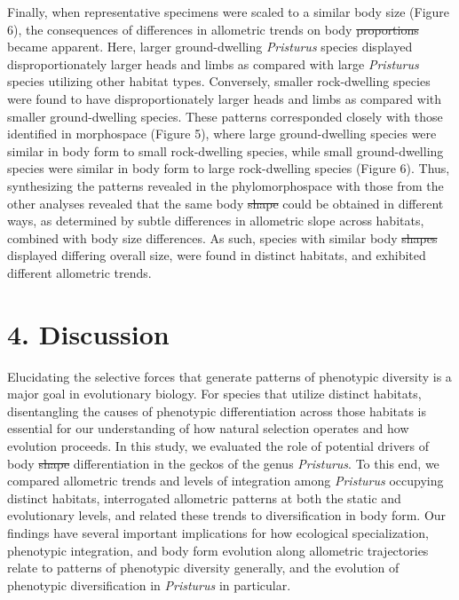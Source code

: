\documentclass[
  11pt,
]{article}
\providecommand{\DIFaddtex}[1]{{\protect\color{blue}\uwave{#1}}} %
\providecommand{\DIFdeltex}[1]{{\protect\color{red}\sout{#1}}}                      %
\providecommand{\DIFaddbegin}{} %
\providecommand{\DIFaddend}{} %
\providecommand{\DIFdelbegin}{} %
\providecommand{\DIFdelend}{} %
\providecommand{\DIFadd}[1]{\texorpdfstring{\DIFaddtex{#1}}{#1}} %
\providecommand{\DIFdel}[1]{\texorpdfstring{\DIFdeltex{#1}}{}} %
\newcommand{\DIFscaledelfig}{0.5}
\newlength{\DIFdelgraphicswidth} %
\newlength{\DIFdelgraphicsheight} %
\newcommand{\DIFaddincludegraphics}[2][]{{\color{blue}\fbox{\DIFOincludegraphics[#1]{#2}}}} %
\newcommand{\DIFdelincludegraphics}[2][]{%
\sbox{\DIFdelgraphicsbox}{\DIFOincludegraphics[#1]{#2}}%
\settoboxwidth{\DIFdelgraphicswidth}{\DIFdelgraphicsbox} %
\settoboxtotalheight{\DIFdelgraphicsheight}{\DIFdelgraphicsbox} %
\scalebox{\DIFscaledelfig}{%
\parbox[b]{\DIFdelgraphicswidth}{\usebox{\DIFdelgraphicsbox}\\[-\baselineskip] \rule{\DIFdelgraphicswidth}{0em}}\llap{\resizebox{\DIFdelgraphicswidth}{\DIFdelgraphicsheight}{%
\setlength{\unitlength}{\DIFdelgraphicswidth}%
\begin{picture}(1,1)%
\thicklines\linethickness{2pt} %
{\color[rgb]{1,0,0}\put(0,0){\framebox(1,1){}}}%
{\color[rgb]{1,0,0}\put(0,0){\line( 1,1){1}}}%
{\color[rgb]{1,0,0}\put(0,1){\line(1,-1){1}}}%
\end{picture}%
}\hspace*{3pt}}} %
} %
\DeclareRobustCommand{\DIFaddbegin}{\DIFOaddbegin \let\includegraphics\DIFaddincludegraphics} %
\DeclareRobustCommand{\DIFaddend}{\DIFOaddend \let\includegraphics\DIFOincludegraphics} %
\DeclareRobustCommand{\DIFdelbegin}{\DIFOdelbegin \let\includegraphics\DIFdelincludegraphics} %
\DeclareRobustCommand{\DIFdelend}{\DIFOaddend \let\includegraphics\DIFOincludegraphics} %
\begin{document}
Finally, when representative specimens were scaled to a similar body
size (Figure 6), the \DIFaddbegin \DIFadd{anatomical }\DIFaddend consequences of differences in
allometric trends on body \DIFdelbegin \DIFdel{proportions }\DIFdelend \DIFaddbegin \DIFadd{form }\DIFaddend became apparent. Here, larger
ground-dwelling \emph{Pristurus} species displayed disproportionately
larger heads and limbs as compared with large \emph{Pristurus} species
utilizing other habitat types. Conversely, smaller rock-dwelling species
were found to have disproportionately larger heads and limbs as compared
with smaller ground-dwelling species. These patterns corresponded
closely with those identified in morphospace (Figure 5), where large
ground-dwelling species were similar in body form to small rock-dwelling
species, while small ground-dwelling species were similar in body form
to large rock-dwelling species (Figure 6). Thus, synthesizing the
patterns revealed in the phylomorphospace with those from the other
analyses revealed that the same body \DIFdelbegin \DIFdel{shape }\DIFdelend \DIFaddbegin \DIFadd{proportions }\DIFaddend could be obtained in
different ways, as determined by subtle differences in allometric slope
across habitats, combined with body size differences. As such, species
with similar body \DIFdelbegin \DIFdel{shapes }\DIFdelend \DIFaddbegin \DIFadd{proportions }\DIFaddend displayed differing overall size, were
found in distinct habitats, and exhibited different allometric trends.
\hfill\break

\hypertarget{discussion}{%
\section{4. Discussion}\label{discussion}}

Elucidating the selective forces that generate patterns of phenotypic
diversity is a major goal in evolutionary biology. For species that
utilize distinct habitats, disentangling the causes of phenotypic
differentiation across those habitats is essential for our understanding
of how natural selection operates and how evolution proceeds. In this
study, we evaluated the role of potential drivers of body \DIFdelbegin \DIFdel{shape
}\DIFdelend \DIFaddbegin \DIFadd{form
}\DIFaddend differentiation in the geckos of the genus \emph{Pristurus}. To this
end, we compared allometric trends and levels of integration among
\emph{Pristurus} occupying distinct habitats, interrogated allometric
patterns at both the static and evolutionary levels, and related these
trends to diversification in body form. Our findings have several
important implications for how ecological specialization, phenotypic
integration, and body form evolution along allometric trajectories
relate to patterns of phenotypic diversity generally, and the evolution
of phenotypic diversification in \emph{Pristurus} in particular.
\hfill\break
\end{document}
